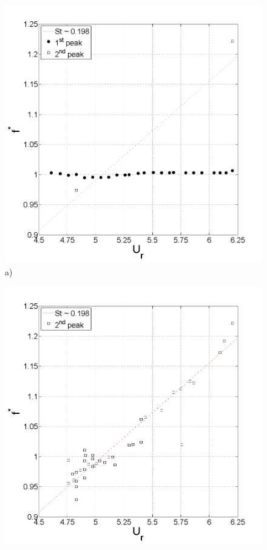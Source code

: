 \documentclass[review]{elsarticle}
\begin{document}
\begin{figure}[h]
\begin{center}
\begin{minipage}[c]{\textwidth}
\begin{minipage}[l]{0.5\textwidth}
\includegraphics[width=1\textwidth]
{Figures/Fig_06_a}
{\footnotesize a)}
\end{minipage}
\begin{minipage}[r]{0.5\textwidth}
\includegraphics[width=1\textwidth]{Figures/Fig_06_b}

\end{minipage}
\end{minipage}
\end{center}
\end{figure}
\end{document}
